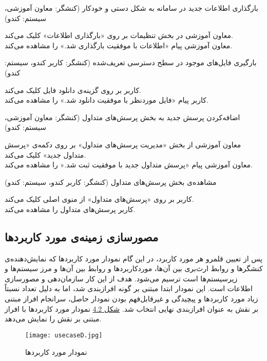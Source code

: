 \documentclass{report}
\begin{document}
\textbf{}
بارگذاری اطلاعات جدید در سامانه به شکل دستی و خودکار (کنشگر: معاون آموزشی، سیستم: کندو)
\begin{addmargin}[.84cm]{0cm}
معاون آموزشی در بخش تنظیمات بر روی «بارگذاری اطلاعات» کلیک می‌کند.\\
معاون آموزشی پیام «اطلاعات با موفقیت بارگذاری شد.» را مشاهده می‌کند.
\end{addmargin}

\textbf{}
بارگیری فایل‌های موجود در سطح دسترسی تعریف‌شده (کنشگر: کاربر کندو، سیستم: کندو)
\begin{addmargin}[.84cm]{0cm}
کاربر بر روی گزینه‌ی دانلود فایل کلیک می‌کند.\\
کاربر پیام «فایل ‌‌مورد‌نظر با موفقیت دانلود شد.» را مشاهده می‌کند.
\end{addmargin}

\textbf{}
اضافه‌کردن پرسش جدید به بخش پرسش‌های متداول (کنشگر: معاون آموزشی، سیستم: کندو)
\begin{addmargin}[.84cm]{0cm}
معاون آموزشی از بخش «مدیریت پرسش‌های متداول» بر روی دکمه‌ی «پرسش متداول جدید» کلیک می‌کند.\\
معاون آموزشی پیام «پرسش متداول جدید با موفقیت ثبت شد.« را مشاهده می‌کند.
\end{addmargin}

\textbf{}
مشاهده‌ی بخش پرسش‌های متداول (کنشگر: کاربر‌ کندو، سیستم: کندو)
\begin{addmargin}[.84cm]{0cm}
کاربر بر روی «پرسش‌های متداول» از منوی اصلی کلیک می‌کند.\\
کاربر پرسش‌های متداول را مشاهده می‌کند.
\end{addmargin}
\clearpage
\subsection{مصورسازی زمینه‌ی مورد کاربردها}
پس از تعیین قلمرو هر مورد کاربرد، در این گام نمودار مورد کاربردها که نمایش‌دهنده‌ی کنشگرها و روابط ارث‌بری بین آن‌ها، موردکاربردها و روابط بین آن‌ها و مرز سیستم‌ها و زیرسیستم‌ها است ترسیم می‌شود. هدف از این کار سازمان‌دهی و مصورسازی اطلاعات است. این نمودار ابتدا مبتنی بر گونه افرازبندی شد، اما به دلیل تعداد نسبتاً زیاد مورد کاربردها و پیچیدگی و غیرقابل‌فهم بودن نمودار حاصل، سرانجام افراز مبتنی بر نقش به ‌عنوان افرازبندی نهایی انتخاب شد. 
\hyperlink{two}{شکل 4.2}
نمودار مورد کاربردها با افراز مبتنی بر نقش را نمایش می‌دهد.
\hypertarget{two}{
\begin{figure}[!h]
\texttt{[image: usecaseD.jpg]}
\caption{نمودار مورد کاربردها}
\end{figure}}
\clearpage
\end{document}
